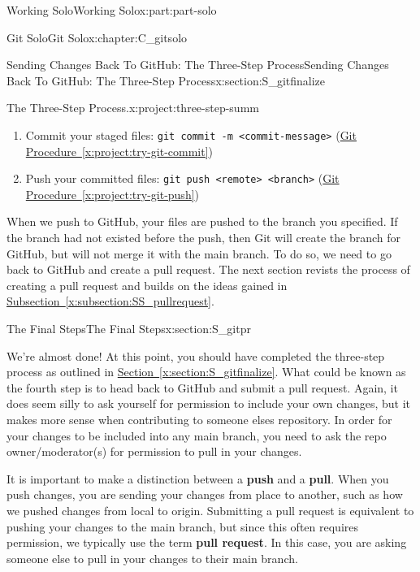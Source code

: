 \documentclass[oneside,10pt,]{book}
\newcommand{\xreffont}{\relax}
\newcommand{\mono}[1]{\texttt{#1}}
\newcommand{\terminology}[1]{\textbf{#1}}
\begin{document}
\begin{partptx}{Working Solo}{}{Working Solo}{}{}{x:part:part-solo}
\begin{chapterptx}{Git Solo}{}{Git Solo}{}{}{x:chapter:C_gitsolo}
\begin{sectionptx}{Sending Changes Back To GitHub: The Three-Step Process}{}{Sending Changes Back To GitHub: The Three-Step Process}{}{}{x:section:S_gitfinalize}
\begin{project}{The Three-Step Process.}{x:project:three-step-summ}
\begin{enumerate}
\item{}Commit your staged files: \mono{git commit -m \textquotedbl{}<commit-message>\textquotedbl{}} (\hyperref[x:project:try-git-commit]{Git Procedure~{\xreffont\ref{x:project:try-git-commit}}})%
\item{}Push your committed files: \mono{git push <remote> <branch>} (\hyperref[x:project:try-git-push]{Git Procedure~{\xreffont\ref{x:project:try-git-push}}})%
\end{enumerate}
%
\end{project}%
%
\begin{conclusion}{}%
When we push to GitHub, your files are pushed to the branch you specified. If the branch had not existed before the push, then Git will create the branch for GitHub, but will not merge it with the main branch. To do so, we need to go back to GitHub and create a pull request. The next section revists the process of creating a pull request and builds on the ideas gained in \hyperref[x:subsection:SS_pullrequest]{Subsection~{\xreffont\ref{x:subsection:SS_pullrequest}}}.%
\end{conclusion}%
\end{sectionptx}
%
%
\typeout{************************************************}
\typeout{************************************************}
%
\begin{sectionptx}{The Final Steps}{}{The Final Steps}{}{}{x:section:S_gitpr}
%
%
%
\begin{introduction}{}%
We're almost done! At this point, you should have completed the three-step process as outlined in \hyperref[x:section:S_gitfinalize]{Section~{\xreffont\ref{x:section:S_gitfinalize}}}. What could be known as the fourth step is to head back to GitHub and submit a pull request. Again, it does seem silly to ask yourself for permission to include your own changes, but it makes more sense when contributing to someone elses repository. In order for your changes to be included into any main branch, you need to ask the repo owner\slash{}moderator(s) for permission to pull in your changes.%
\par
It is important to make a distinction between a \terminology{push} and a \terminology{pull}. When you push changes, you are sending your changes from place to another, such as how we pushed changes from local to origin. Submitting a pull request is equivalent to pushing your changes to the main branch, but since this often requires permission, we typically use the term \terminology{pull request}. In this case, you are asking someone else to pull in your changes to their main branch.%

\end{introduction}
\end{sectionptx}
\end{chapterptx}
\end{partptx}
\end{document}
